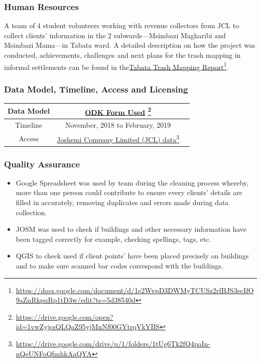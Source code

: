 \documentclass[a4paper,12pt,twoside]{article}
\begin{document}
\subsubsection{Human Resources}
A team of 4 student volunteers working with revenue collectors from JCL to collect clients’ information in the 2 subwards---Msimbazi Magharibi and Msimbazi Mama---in Tabata ward. A detailed description on how the project was conducted, achievements, challenges and next plans for the trash mapping in informal settlements can be found in the\href{https://docs.google.com/document/d/1e2WvpD3DWMyTCUSz2rfBJS3ecIfO9aZnRkpuRp1tD3w/edit?ts=5d38540d}{Tabata Trash Mapping Report}\footnote{\url{https://docs.google.com/document/d/1e2WvpD3DWMyTCUSz2rfBJS3ecIfO9aZnRkpuRp1tD3w/edit?ts=5d38540d}}.

\subsubsection{Data Model, Timeline, Access and Licensing}
\begin{center}
\begin{tabular}{|c|c|c|}  
 \hline
Data Model &
      \href{https://drive.google.com/open?id=1vwZyjcsQLQaZ95yjMnNf00GYtrqVkYBS}{ODK Form Used} \footnote{\url{https://drive.google.com/open?id=1vwZyjcsQLQaZ95yjMnNf00GYtrqVkYBS}} \\
 \hline
  Timeline  &  November, 2018 to February, 2019 \\
\hline  
 Access  & 
   \href{https://drive.google.com/drive/u/1/folders/1tUg6Tk2fQ4paIn-nQeUNFoQfmhkAaQYA}{Joshemi Company Limited (JCL) data}\footnote{\url{https://drive.google.com/drive/u/1/folders/1tUg6Tk2fQ4paIn-nQeUNFoQfmhkAaQYA}} \\
\hline
\end{tabular}
\end{center}

\subsubsection{Quality Assurance}
\begin{itemize}
    \item Google Spreadsheet was used by team during the cleaning process whereby, more than one person could contribute to ensure every clients’ details are filled in accurately, removing duplicates and errors made during data collection.
    \item JOSM was used to check if buildings and other necessary information have been tagged correctly for example, checking spellings, tags, etc.
    \item QGIS to check used if client points' have been placed precisely on buildings and to make sure scanned bar codes correspond with the buildings.
\end{itemize}
\end{document}
